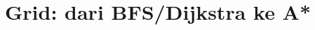 \documentclass[../../main.tex]{subfiles}
\begin{document}
\chapter{ Grid: dari BFS/Dijkstra ke A*}
\label{chap:pathfinding}
























\ifSubfilesClassLoaded{%
  \clearpage
}{}
\end{document}
